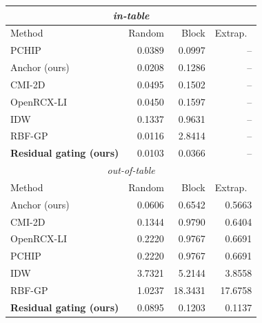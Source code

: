 \small
\begin{tabular}{lrrr}\toprule
\multicolumn{4}{c}{\emph{in-table}} \\\midrule
Method & Random & Block & Extrap.\ \\\midrule
PCHIP & 0.0389 & 0.0997 & -- \\
Anchor (ours) & 0.0208 & 0.1286 & -- \\
CMI-2D & 0.0495 & 0.1502 & -- \\
OpenRCX-LI & 0.0450 & 0.1597 & -- \\
IDW & 0.1337 & 0.9631 & -- \\
RBF-GP & 0.0116 & 2.8414 & -- \\
\textbf{Residual gating (ours)} & 0.0103 & 0.0366 & -- \\
\midrule\multicolumn{4}{c}{\emph{out-of-table}} \\\midrule
Method & Random & Block & Extrap.\ \\\midrule
Anchor (ours) & 0.0606 & 0.6542 & 0.5663 \\
CMI-2D & 0.1344 & 0.9790 & 0.6404 \\
OpenRCX-LI & 0.2220 & 0.9767 & 0.6691 \\
PCHIP & 0.2220 & 0.9767 & 0.6691 \\
IDW & 3.7321 & 5.2144 & 3.8558 \\
RBF-GP & 1.0237 & 18.3431 & 17.6758 \\
\textbf{Residual gating (ours)} & 0.0895 & 0.1203 & 0.1137 \\
\bottomrule\end{tabular}
